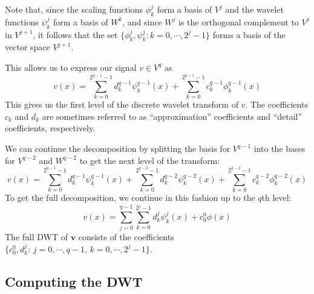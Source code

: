 Note that, since the scaling functions $\phi_k^j$ form a basis of $V^j$ and the wavelet functions $\psi_k^j$ form a basis of $W^k$, and since $W^j$ is the orthogonal complement to $V^j$ in $V^{j+1}$, it follows that the set $\{\phi_k^j, \psi_k^j: k=0,\cdots,2^j-1\}$ forms a basis of the vector space $V^{j+1}$.

This allows us to express our signal $v \in V^q$ as 
\begin{equation*}
  v(x) = \sum_{k=0}^{2^{q-1}-1} d_k^{q-1}\psi_k^{q-1}(x) + \sum_{k=0}^{2^{q-1}-1} c_k^{q-1}\phi_k^{q-1}(x)
\end{equation*}
This gives us the first level of the discrete wavelet transform of $v$.
The coefficients $c_k$ and $d_k$ are sometimes referred to as ``approximation'' coefficients and ``detail'' coefficients, respectively.

We can continue the decomposition by splitting the basis for $V^{q-1}$ into the bases for $V^{q-2}$ and $W^{q-2}$ to get the next level of the transform:
\begin{equation*}
  v(x) = \sum_{k=0}^{2^{q-1}-1} d_k^{q-1}\psi_k^{q-1}(x) + \sum_{k=0}^{2^{q-2}-1} d_k^{q-2}\psi_k^{q-2}(x) + \sum_{k=0}^{2^{q-2}-1} c_k^{q-2}\phi_k^{q-2}(x)
\end{equation*}
To get the full decomposition, we continue in this fashion up to the $q$th level:
\begin{equation*}
  v(x) = \sum_{j=0}^{q-1} \sum_{k=0}^{2^j-1} d_k^{j} \psi_k^j(x) + c_0^0\phi(x)
\end{equation*}
The full DWT of $\bm v$ consists of the coefficients $\{c_0^0, d_k^j:\,j=0,\cdots,q-1, \, k=0,\cdots,2^j-1\}$.


\subsection{Computing the DWT}


